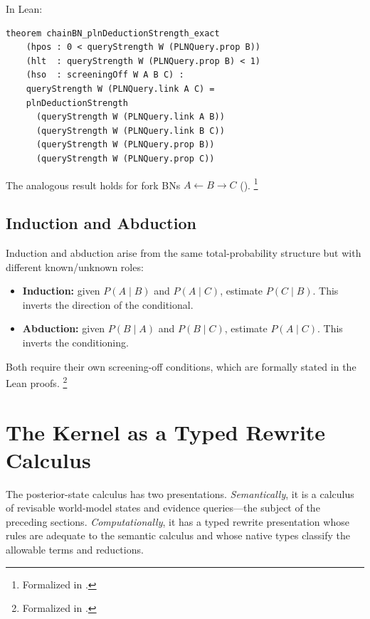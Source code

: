 \documentclass[11pt,openany]{report}
\begin{document}
In Lean:
\begin{lstlisting}
theorem chainBN_plnDeductionStrength_exact
    (hpos : 0 < queryStrength W (PLNQuery.prop B))
    (hlt  : queryStrength W (PLNQuery.prop B) < 1)
    (hso  : screeningOff W A B C) :
    queryStrength W (PLNQuery.link A C) =
    plnDeductionStrength
      (queryStrength W (PLNQuery.link A B))
      (queryStrength W (PLNQuery.link B C))
      (queryStrength W (PLNQuery.prop B))
      (queryStrength W (PLNQuery.prop C))
\end{lstlisting}

The analogous result holds for fork BNs $A \leftarrow B \to C$
().%
\footnote{Formalized in .}

\subsection{Induction and Abduction}

Induction and abduction arise from the same total-probability structure
but with different known/unknown roles:

\begin{itemize}
\item \textbf{Induction:} given $P(A \mid B)$ and $P(A \mid C)$,
  estimate $P(C \mid B)$.  This inverts the direction of the conditional.
\item \textbf{Abduction:} given $P(B \mid A)$ and $P(B \mid C)$,
  estimate $P(A \mid C)$.  This inverts the conditioning.
\end{itemize}

Both require their own screening-off conditions, which are
formally stated in the Lean proofs.%
\footnote{Formalized in .}

\section{The Kernel as a Typed Rewrite Calculus}
\label{sec:kernel-typed-rewrite}

The posterior-state calculus has two presentations.  \emph{Semantically},
it is a calculus of revisable world-model states and evidence queries---the
subject of the preceding sections.  \emph{Computationally}, it has a typed
rewrite presentation whose rules are adequate to the semantic calculus and
whose native types classify the allowable terms and reductions.
\end{document}
